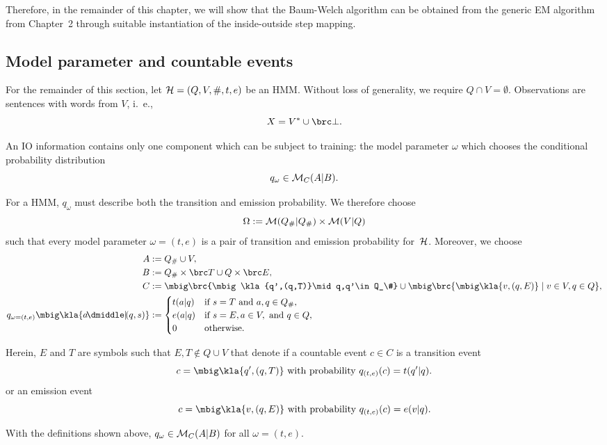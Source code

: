Therefore, in the remainder of this chapter, we will show that the Baum-Welch
algorithm can be obtained from the generic EM algorithm from Chapter~2 through
suitable instantiation of the inside-outside step mapping.

\subsection{Model parameter and countable events}

For the remainder of this section, let $\mathcal H = (Q,V,\#,t,e)$ be an HMM. Without
loss of generality, we require $Q\cap V=\emptyset$. Observations are sentences
with words from $V$, i.~e.,
\[
 X = V^* \cup\brc\bot. \label{eq:03-X}
\]

An IO information contains only one component which can be subject to training:
the model parameter $\omega$ which chooses the conditional probability
distribution
\[
 q_\omega \in \mathcal M_C(A|B).
\]

For a HMM, $q_\omega$ must describe both the transition and emission
probability. We therefore choose
\label{eq:03-omega}
\[
 \Omega := \mathcal M(Q_\#|Q_\#) \times\mathcal M(V|Q)
\]
such that every model parameter $\omega=(t,e)$ is a pair of transition and
emission probability for~$\mathcal H$. Moreover, we choose
\label{eq:03-ABC}\begin{align*}
 A &:= Q_\#\cup V, \\
 B &:= Q_\# \times \brc T \cup Q \times \brc E, \\
 C &:= \mbig\brc{\mbig\kla{q',(q,T)}\mid q,q'\in Q_\#} \cup \mbig\brc{\mbig\kla{v,(q,E)}\mid v\in V, q\in Q}, \\
 q_{\omega=(t,e)}\mbig\kla{a\npipe(q,s)} &:= \begin{cases}
  t(a|q) & \text{if } s = T \text{ and } a,q\in Q_\#, \\
  e(a|q) & \text{if } s = E, a\in V\!, \text{ and } q \in Q, \\
  0 & \text{otherwise}.
 \end{cases}
\end{align*}

Herein, $E$ and $T$ are symbols such that $E,T\notin Q\cup V$ that denote if a
countable event $c\in C$ is a transition event
\[
 c = \mbig\kla{q',(q,T)} \text{ with probability } q_{(t,e)}(c) = t(q'|q).
\]
or an emission event
\[
 c = \mbig\kla{v,(q,E)} \text{ with probability } q_{(t,e)}(c) = e(v|q).
\]

\begin{lemma}
 With the definitions shown above, $q_\omega\in\mathcal M_C(A|B)$ for all $\omega=(t,e)$.
\end{lemma}

